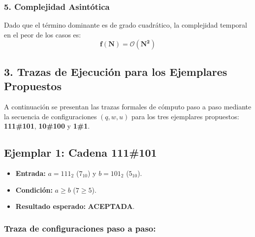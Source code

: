 \subsubsection*{5. Complejidad Asintótica}

Dado que el término dominante es de grado cuadrático, la complejidad temporal en el peor de los casos es:
\[ \mathbf{f(N) = \mathcal{O}(N^2)} \]

\subsection*{3. Trazas de Ejecución para los Ejemplares Propuestos}

A continuación se presentan las trazas formales de cómputo paso a paso mediante la secuencia de configuraciones $(q, w, u)$ para los tres ejemplares propuestos: \textbf{111\#101}, \textbf{10\#100} y \textbf{1\#1}.

\subsection*{Ejemplar 1: Cadena 111\#101}

\begin{itemize}[leftmargin=*]
    \item \textbf{Entrada:} $a = 111_2$ ($7_{10}$) y $b = 101_2$ ($5_{10}$).
    \item \textbf{Condición:} $a \ge b$ ($7 \ge 5$).
    \item \textbf{Resultado esperado:} \textbf{ACEPTADA}.
\end{itemize}

\subsubsection*{Traza de configuraciones paso a paso:}

